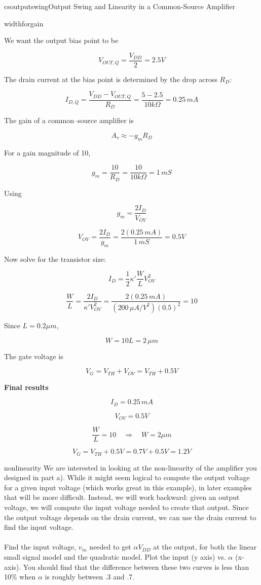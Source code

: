 \begin{mainquestion}{csoutputswing}{Output Swing and Linearity in a Common-Source Amplifier}
\begin{partquestion}{widthforgain}
\begin{answer}[3in]
We want the output bias point to be

\[
V_{OUT,Q} = \frac{V_{DD}}{2} = 2.5V
\]

The drain current at the bias point is determined by the drop across $R_D$:

\[
I_{D,Q} = \frac{V_{DD}-V_{OUT,Q}}{R_D}
       = \frac{5-2.5}{10k\Omega}
       = 0.25\,mA
\]

The gain of a common–source amplifier is

\[
A_v \approx -g_m R_D
\]

For a gain magnitude of 10,

\[
g_m = \frac{10}{R_D}
     = \frac{10}{10k\Omega}
     = 1\,mS
\]

Using

\[
g_m = \frac{2I_D}{V_{OV}}
\]

\[
V_{OV} = \frac{2I_D}{g_m}
       = \frac{2(0.25\,mA)}{1\,mS}
       = 0.5V
\]

Now solve for the transistor size:

\[
I_D = \frac{1}{2}\kappa' \frac{W}{L} V_{OV}^2
\]

\[
\frac{W}{L}
=
\frac{2I_D}{\kappa' V_{OV}^2}
=
\frac{2(0.25\,mA)}
{(200\,\mu A/V^2)(0.5)^2}
=10
\]

Since $L=0.2\mu m$,

\[
W = 10L = 2\,\mu m
\]

The gate voltage is

\[
V_G = V_{TH} + V_{OV} = V_{TH}+0.5V
\]

\textbf{Final results}

\[
I_D = 0.25\,mA
\]

\[
V_{OV} = 0.5V
\]

\[
\frac{W}{L}=10 \quad\Rightarrow\quad W=2\mu m
\]

\[
V_G = V_{TH}+0.5V = 0.7V + 0.5V = 1.2V
\]
\end{answer}

\end{partquestion}

\begin{partquestion}{nonlinearity}
{We are interested in looking at the non-linearity of the amplifier you designed in part a). While it might seem logical to compute the output voltage for a given input voltage (which works great in this example), in later examples that will be more difficult.  Instead, we will work backward: given an output voltage, we will compute the input voltage needed to create that output.  Since the output voltage depends on the drain current, we can use the drain current to find the input voltage.
\\
\\
Find the input voltage, $v_{in}$ needed to get $\alpha V_{DD}$ at the output, for both the linear small signal model and the quadratic model. Plot the input (y axis) vs. $\alpha$ (x-axis).  You should find that the difference between these two curves is less than 10\% when $\alpha$ is roughly between .3 and .7.}


\end{partquestion}
\end{mainquestion}
